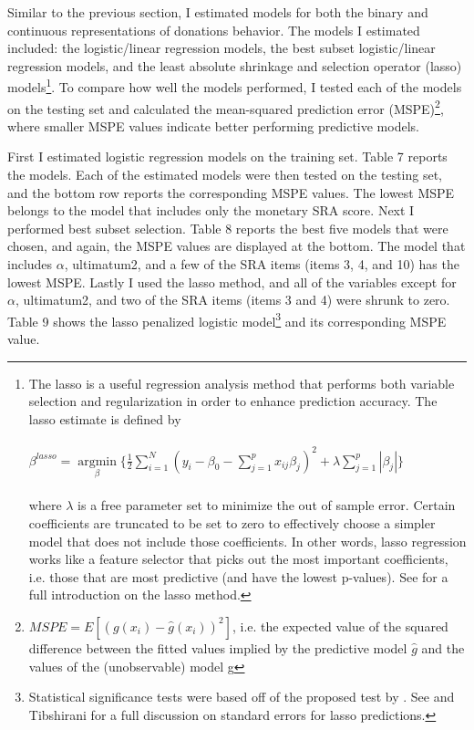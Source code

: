 \documentclass[12pt]{article}
\begin{document}
Similar to the previous section, I estimated models for both the binary and continuous representations of donations behavior. The models I estimated included: the logistic/linear regression models, the best subset logistic/linear regression models, and the least absolute shrinkage and selection operator (lasso) models\footnote{The lasso is a useful regression analysis method that performs both variable selection and regularization in order to enhance prediction accuracy. The lasso estimate is defined by\\ \\
\( \beta^{lasso}=\mathop\mathrm{argmin}\limits_{\beta} \{ \frac{1}{2} \sum_{i=1}^{N} (y_{i} - \beta_{0} - \sum_{j=1}^{p}x_{ij}\beta _{j})^{2}+\lambda\sum_{j=1}^{p}|\beta _{j}|\} \) \\ \\
where \(\lambda\) is a free parameter set to minimize the out of sample error. Certain coefficients are truncated to be set to zero to effectively choose a simpler model that does not include those coefficients. In other words, lasso regression works like a feature selector that picks out the most important coefficients, i.e. those that are most predictive (and have the lowest p-values). See \cite{tibshirani_1996} for a full introduction on the lasso method.}. To compare how well the models performed, I tested each of the models on the testing set and calculated the mean-squared prediction error (MSPE)\footnote{\(MSPE = E[(g(x_{i}) - \hat{g}(x_{i}))^{2}]\), i.e. the expected value of the squared difference between the fitted values implied by the predictive model \(\hat{g}\) and the values of the (unobservable) model g}, where smaller MSPE values indicate better performing predictive models.

First I estimated logistic regression models on the training set. Table 7 reports the models. Each of the estimated models were then tested on the testing set, and the bottom row reports the corresponding MSPE values. The lowest MSPE belongs to the model that includes only the monetary SRA score. Next I performed best subset selection. Table 8 reports the best five models that were chosen, and again, the MSPE values are displayed at the bottom. The model that includes \(\alpha\), ultimatum2, and a few of the SRA items (items 3, 4, and 10) has the lowest MSPE. Lastly I used the lasso method, and all of the variables except for \(\alpha\), ultimatum2, and two of the SRA items (items 3 and 4) were shrunk to zero. Table 9 shows the lasso penalized logistic model\footnote{Statistical significance tests were based off of the proposed test by \cite{lockhart_2014}. See \cite{kyung_2010} and Tibshirani for a full discussion on standard errors for lasso predictions.} and its corresponding MSPE value.
\end{document}

